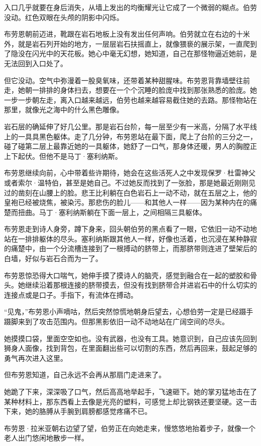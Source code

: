 \documentclass[AutoFakeBold=true]{book}
\begin{document}
入口几乎就要在身后消失，从墙上发出的均衡耀光让它成了一个微弱的糊点。伯劳没动。红色双眼在头颅的阴影中闪烁。

布劳恩朝前迈进，靴跟在岩石地板上没有发出任何声响。伯劳就立在右边的十米外，就是岩石列开始的地方，一层层岩石扶摇直上，就像猥亵的展示架，一直爬到了隐没在闪光中的天花板。她心中毫无幻想，她知道，自己在那怪物逼近她前，是无法回到入口处了。

但它没动。空气中弥漫着一股臭氧味，还带着某种甜腥味。布劳恩背靠墙壁往前走，她朝一排排的身体扫去，想要在一个个沉睡的脸庞中找到那张熟悉的脸庞。她一步一步朝左走，离入口越来越远，伯劳也越来越容易截住她的去路。那怪物站在那里，就像光之海中的什么黑色雕像。

岩石层的确延伸了好几公里。那是岩石台阶，每一层至少有一米高，分隔了水平线上的一具具黑色躯体。走了几分钟，布劳恩站在最下面，爬上了台阶的三分之一，碰了碰第二层上最靠近她的一具躯体，她舒了一口气，那身体还暖，男人的胸膛正上下起伏。但他不是马丁·塞利纳斯。

布劳恩继续向前，心中带着些许期待，她会在这些活死人之中发现保罗·杜雷神父或者索尔·温特伯，甚至是她自己。不过她反而找到了一张脸，那是她最近刚刚见过的凿刻在山腰上的脸。悲王比利躺在白色岩石上一动不动，就在五层之上，他的皇袍已经被烧焦，被染污。那悲伤的脸儿——和其他人一样——因为某种内在的痛楚而扭曲。马丁·塞利纳斯躺在下面一层上，之间相隔三具躯体。

布劳恩走到诗人身旁，蹲下身来，回头朝伯劳的黑点看了一眼，它依旧一动不动地站在一排排躯体的尽头。塞利纳斯跟其他人一样，好像也活着，也沉浸在某种静寂的痛楚中，由一个分流槽连接到了一根搏动的脐带上，而那脐带则连进了壁架后的白墙，好似与岩石合而为一了。

布劳恩惊恐得大口喘气，她伸手摸了摸诗人的脑壳，感觉到融合在一起的塑胶和骨头。她继续沿着那根连接的脐带摸去，但没有找到脐带合并进岩石中的什么切实的连接点或是口子。手指下，有流体在搏动。

``见鬼，''布劳恩小声嘀咕，然后突然惊慌地朝身后望去，心想伯劳一定是已经蹑手蹑脚来到了攻击范围内。但那黑影依旧一动不动地站在广阔空间的尽头。

她摸摸口袋，里面空空如也。没有武器，也没有工具。她意识到，自己应该先回到狮身人面像，找到背包，在里面翻出些可以切割的东西，然后再回来，鼓起足够的勇气再次进入这里。

但布劳恩知道，自己永远不会再从那扇门走进来了。

她跪了下来，深深吸了口气，然后高高地举起手，飞速砸下。她的掌刃猛地击在了某种材料上，那东西看上去像是光亮的塑料，可感觉上却比钢铁还要坚硬。这一击下来，她的胳膊从手腕到肩膀都感觉疼痛不已。

布劳恩·拉米亚朝右边望了望，伯劳正在向她走来，慢悠悠地抬着步子，就像一个老人出门悠闲地散步一样。
\end{document}
